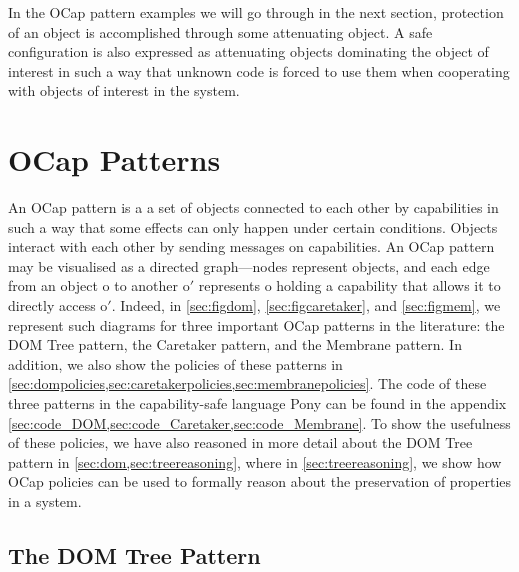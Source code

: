 \documentclass[a4paper,11pt,twoside]{article}
\begin{document}
In the OCap pattern examples we will go through in the next section, protection of an object is accomplished through some attenuating object. A safe configuration is also expressed as attenuating objects dominating the object of interest in such a way that unknown code is forced to use them when cooperating with objects of interest in the system.

\newpage
\section{OCap Patterns}\label{sec:ocappatterns}

An OCap pattern is a a set of objects connected to each other by capabilities in such a way that some effects can only happen under certain conditions. Objects interact with each other by sending messages on capabilities. An OCap pattern may be visualised as a directed graph---nodes represent objects, and each edge from an object o to another o$'$ represents o holding a capability that allows it to directly access o$'$. Indeed, in \cref{sec:figdom}, \cref{sec:figcaretaker}, and \cref{sec:figmem}, we represent such diagrams for three important OCap patterns in the literature: the DOM Tree pattern, the Caretaker pattern, and the Membrane pattern. In addition, we also show the policies of these patterns in \cref{sec:dompolicies,sec:caretakerpolicies,sec:membranepolicies}. The code of these three patterns in the capability-safe language Pony\cite{clebsch2015} can be found in the appendix \cref{sec:code_DOM,sec:code_Caretaker,sec:code_Membrane}. To show the usefulness of these policies, we have also reasoned in more detail about the DOM Tree pattern in \cref{sec:dom,sec:treereasoning}, where in \cref{sec:treereasoning}, we show how OCap policies can be used to formally reason about the preservation of properties in a system.
\subsection{The DOM Tree Pattern}\label{sec:dom}
\end{document}
